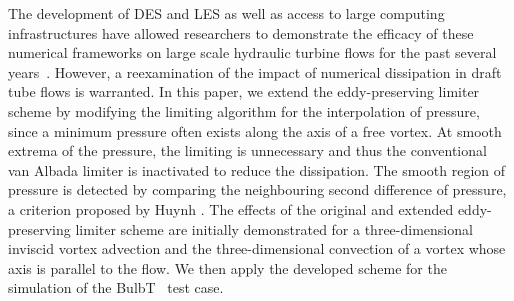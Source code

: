 The development of DES and LES as well as access to large computing infrastructures have allowed researchers to demonstrate the efficacy of these numerical frameworks on large scale hydraulic turbine flows for the past several years~\cite{jovst2011numerical, foroutan2014flow, krappel2014investigation, taheri2015detached, pacot2015prediction, wilhelm2016head}. However, a reexamination of the impact of numerical dissipation  in draft tube flows is warranted. In this paper, we extend the eddy-preserving limiter scheme by modifying the limiting algorithm for the interpolation of pressure, since a minimum pressure often exists along the axis of a free vortex. At smooth extrema of the pressure, the limiting is unnecessary and thus the conventional van Albada limiter is inactivated to reduce the dissipation. The smooth region of pressure is detected by comparing the neighbouring second difference of pressure, a criterion proposed by Huynh \cite{huynh1995accurate}. The effects of the original and extended eddy-preserving limiter scheme are initially demonstrated for a three-dimensional inviscid vortex advection and the three-dimensional convection of a vortex whose axis is parallel to the flow. We then apply the developed scheme for the simulation of the BulbT~\cite{vu2014cfd} test case.